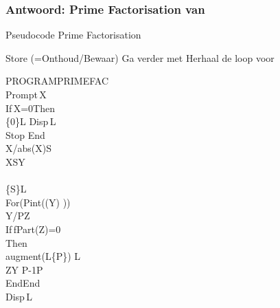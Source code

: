 \begin{frame}
\frametitle{Antwoord: Prime Factorisation van }


\vspace{-0.5cm}
\hspace{-1cm}
\begin{minipage}{0.82\textwidth}
	\begin{algorithm}[H]
	\caption{Pseudocode Prime Factorisation}
	\begin{algorithmic}[1]
	   
	      \State Store (=Onthoud/Bewaar) 
	      \State Ga verder met 
	      \State Herhaal de loop voor 
	    \EndIf
	  \EndFor
	\EndFunction
	\end{algorithmic}
	\end{algorithm}
\end{minipage}
\begin{minipage}{0.15\textwidth}%
\begin{ticalc}
	PROGRAM\:PRIMEFAC\\%
	\:Prompt\,X\\%
	\:If\,X=0\:Then\\%
	\:\{0\}\>L
	\:Disp\,L\\%
	\:Stop
	\:End\\%
	\:X/abs(X)\>S\\%
	\:XS\>Y\\%
	\:\\%
	\:\{S\}\>L\\%
	\:For(P\comma int(\sqrt(Y) ))\\%
	\:Y/P\>Z\\%
	\:If\,fPart(Z)=0\\%
	\:Then\\%
	\:augment(L\comma\{P\}) \>L\\%
	\:Z\>Y
	\:P-1\>P\\%
	\:End\:End\\%
	\:Disp\,L
\end{ticalc}
\end{minipage}

\end{frame}



